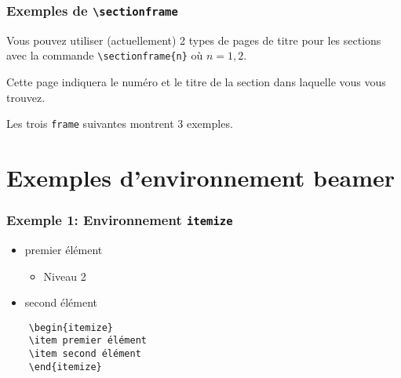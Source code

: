 \documentclass[t,aspectratio=169]{beamer}
\begin{document}
\begin{frame} 
    \frametitle{Exemples de \texttt{\textbackslash sectionframe}}

    Vous pouvez utiliser (actuellement) 2 types de pages de titre pour
    les sections avec la commande \texttt{\textbackslash sectionframe\{n\}} 
    où $n=1,2$.\newline

    Cette page indiquera le numéro et le titre de la section dans laquelle
    vous vous trouvez.\newline

    Les trois \texttt{frame} suivantes montrent 3 exemples.
\end{frame}

\section{Exemples d'environnement beamer}

\begin{frame}[fragile]
    \frametitle{Exemple 1: Environnement \texttt{itemize}}
\begin{itemize}
    \item premier élément 
        \begin{itemize}
            \item Niveau 2
        \end{itemize}
    \item second élément
\end{itemize}
\begin{verbatim}
    \begin{itemize}
    \item premier élément 
    \item second élément
    \end{itemize}
\end{verbatim}
\end{frame}
\end{document}
